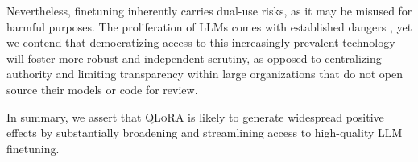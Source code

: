 Nevertheless, finetuning inherently carries dual-use risks, as it may be misused for harmful purposes. The proliferation of LLMs comes with established dangers \citep{bommasani2021opportunities,bender2021dangers}, yet we contend that democratizing access to this increasingly prevalent technology will foster more robust and independent scrutiny, as opposed to centralizing authority and limiting transparency within large organizations that do not open source their models or code for review.

In summary, we assert that \textsc{QLoRA} is likely to generate widespread positive effects by substantially broadening and streamlining access to high-quality LLM finetuning.